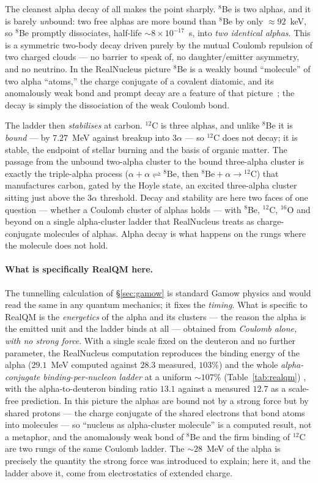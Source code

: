 \documentclass[11pt]{article}
\begin{document}
The cleanest alpha decay of all makes the point sharply. $^8$Be is two alphas, and it is barely
\emph{un}bound: two free alphas are more bound than $^8$Be by only $\approx92$~keV, so $^8$Be promptly
dissociates, half-life $\sim8\times10^{-17}$~s, into \emph{two identical alphas}. This is a symmetric
two-body decay driven purely by the mutual Coulomb repulsion of two charged clouds --- no barrier to speak
of, no daughter/emitter asymmetry, and no neutrino. In the RealNucleus picture $^8$Be is a weakly bound
``molecule'' of two alpha ``atoms,'' the charge conjugate of a covalent diatomic, and its anomalously weak
bond and prompt decay are a feature of that picture~\cite{RealNucleus}; the decay is simply the
dissociation of the weak Coulomb bond.

The ladder then \emph{stabilises} at carbon. $^{12}$C is three alphas, and unlike $^8$Be it is
\emph{bound} --- by $7.27$~MeV against breakup into $3\alpha$ --- so $^{12}$C does not decay; it is stable,
the endpoint of stellar burning and the basis of organic matter. The passage from the unbound two-alpha
cluster to the bound three-alpha cluster is exactly the triple-alpha process ($\alpha+\alpha\rightleftharpoons
{}^8\mathrm{Be}$, then ${}^8\mathrm{Be}+\alpha\to{}^{12}\mathrm{C}$) that manufactures carbon, gated by the
Hoyle state, an excited three-alpha cluster sitting just above the $3\alpha$ threshold. Decay and stability
are here two faces of one question --- whether a Coulomb cluster of alphas holds --- with $^8$Be, $^{12}$C,
$^{16}$O and beyond on a single alpha-cluster ladder that RealNucleus treats as charge-conjugate molecules
of alphas. Alpha decay is what happens on the rungs where the molecule does not hold.

\paragraph{What is specifically RealQM here.} The tunnelling calculation of \S\ref{sec:gamow} is standard
Gamow physics and would read the same in any quantum mechanics; it fixes the \emph{timing}. What is
specific to RealQM is the \emph{energetics} of the alpha and its clusters --- the reason the alpha is the
emitted unit and the ladder binds at all --- obtained from \emph{Coulomb alone, with no strong force}. With
a single scale fixed on the deuteron and no further parameter, the RealNucleus computation reproduces the
binding energy of the alpha ($29.1$~MeV computed against $28.3$ measured, $103\%$) and the whole
\emph{alpha-conjugate binding-per-nucleon ladder} at a uniform $\sim107\%$ (Table~\ref{tab:realqm})
\cite{RealNucleus}, with the alpha-to-deuteron binding ratio $13.1$ against a measured $12.7$ as a
scale-free prediction. In this picture the alphas are bound not by a strong force but by shared protons ---
the charge conjugate of the shared electrons that bond atoms into molecules --- so ``nucleus as
alpha-cluster molecule'' is a computed result, not a metaphor, and the anomalously weak bond of $^8$Be and
the firm binding of $^{12}$C are two rungs of the same Coulomb ladder. The $\sim28$~MeV of the alpha is
precisely the quantity the strong force was introduced to explain; here it, and the ladder above it, come
from electrostatics of extended charge.
\end{document}
